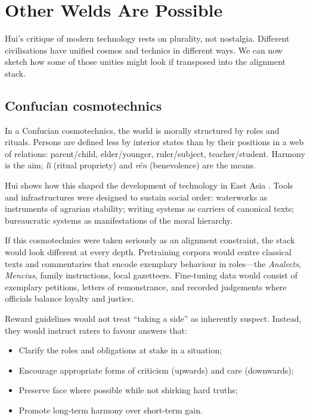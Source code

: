 \documentclass[12pt,a4paper]{article}
\begin{document}
\section{Other Welds Are Possible}

Hui's critique of modern technology rests on plurality, not nostalgia. Different civilisations have unified cosmos and technics in different ways. We can now sketch how some of those unities might look if transposed into the alignment stack.

\subsection{Confucian cosmotechnics}

In a Confucian cosmotechnics, the world is morally structured by roles and rituals. Persons are defined less by interior states than by their positions in a web of relations: parent/child, elder/younger, ruler/subject, teacher/student. Harmony is the aim; \emph{l\v{\i}} (ritual propriety) and \emph{r\'en} (benevolence) are the means.

Hui shows how this shaped the development of technology in East Asia \cite{Hui2016}. Tools and infrastructures were designed to sustain social order: waterworks as instruments of agrarian stability; writing systems as carriers of canonical texts; bureaucratic systems as manifestations of the moral hierarchy.

If this cosmotechnics were taken seriously as an alignment constraint, the stack would look different at every depth. Pretraining corpora would centre classical texts and commentaries that encode exemplary behaviour in roles---the \emph{Analects}, \emph{Mencius}, family instructions, local gazetteers. Fine-tuning data would consist of exemplary petitions, letters of remonstrance, and recorded judgements where officials balance loyalty and justice.

Reward guidelines would not treat ``taking a side'' as inherently suspect. Instead, they would instruct raters to favour answers that:

\begin{itemize}
  \item Clarify the roles and obligations at stake in a situation;
  \item Encourage appropriate forms of criticism (upwards) and care (downwards);
  \item Preserve face where possible while not shirking hard truths;
  \item Promote long-term harmony over short-term gain.
\end{itemize}
\end{document}
